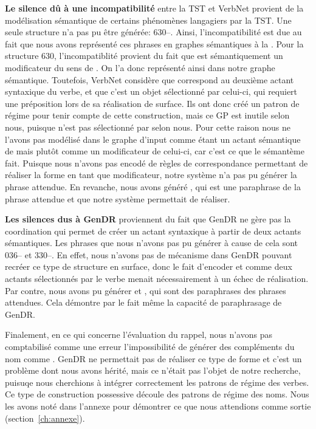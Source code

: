 \textbf{Le silence dû à une incompatibilité} entre la \ac{TST} et VerbNet provient de la modélisation sémantique de certains phénomènes langagiers par la \ac{TST}. Une seule structure n'a pas pu être générée: 630--. Ainsi, l'incompatibilité est due au fait que nous avons représenté ces phrases en graphes sémantiques à la \cite{mel2012semantics}. 
Pour la structure 630, l'incompatiblité provient du fait que  est sémantiquement un modificateur du sens de . On l'a donc représenté ainsi dans notre graphe sémantique. Toutefois, VerbNet considère que  correspond au deuxième actant syntaxique du verbe, et que c'est un objet sélectionné par celui-ci, qui requiert une préposition lors de sa réalisation de surface. Ils ont donc créé un patron de régime pour tenir compte de cette construction, mais ce \ac{GP} est inutile selon nous, puisque  n'est pas sélectionné par  selon nous. Pour cette raison nous ne l'avons pas modélisé dans le graphe d'input comme étant un actant sémantique de  mais plutôt comme un modificateur de celui-ci, car c'est ce que le sémantème  fait. Puisque nous n'avons pas encodé de règles de correspondance permettant de réaliser la forme  en tant que modificateur, notre système n'a pas pu générer la phrase attendue. En revanche, nous avons généré , qui est une paraphrase de la phrase attendue et que notre système permettait de réaliser. 

\textbf{Les silences dus à GenDR} proviennent du fait que GenDR ne gère pas la coordination qui permet de créer un actant syntaxique à partir de deux actants sémantiques. Les phrases que nous n'avons pas pu générer à cause de cela sont 036-- et 330--. En effet, nous n'avons pas de mécanisme dans GenDR pouvant recréer ce type de structure en surface, donc le fait d'encoder  et  comme deux actants sélectionnés par le verbe menait nécessairement à un échec de réalisation. Par contre, nous avons pu générer  et , qui sont des paraphrases des phrases attendues. Cela démontre par le fait même la capacité de paraphrasage de GenDR.

Finalement, en ce qui concerne l'évaluation du rappel, nous n'avons pas comptabilisé comme une erreur l'impossibilité de générer des compléments du nom comme . GenDR ne permettait pas de réaliser ce type de forme et c'est un problème dont nous avons hérité, mais ce n'était pas l'objet de notre recherche, puisuqe nous cherchions à intégrer correctement les patrons de régime des verbes. Ce type de construction possessive découle des patrons de régime des noms. Nous les avons noté dans l’annexe pour démontrer ce que nous attendions comme sortie (section~\ref{ch:annexe}).

